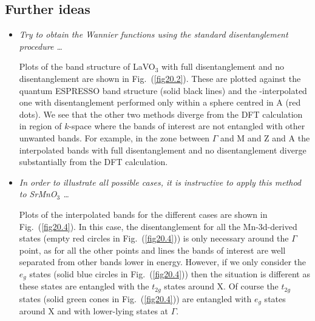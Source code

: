 \subsection*{Further ideas}
\begin{itemize}
	\item {\it Try to obtain the Wannier functions using the standard disentanglement procedure \dots}

	Plots of the band structure of LaVO$_3$ with full disentanglement and no disentanglement are shown in Fig.~(\ref{fig20.2}). These are plotted against the quantum ESPRESSO band structure (solid black lines) and the \Wannier{}-interpolated one with disentanglement performed only within a sphere centred in A (red dots). We see that the other two methods diverge from the DFT calculation in region of $k$-space where the bands of interest are not entangled with other unwanted bands. For example, in the zone between $\Gamma$ and M and Z and A the interpolated bands with full disentanglement and no disentanglement diverge substantially from the DFT calculation.  

	\item {\it In order to illustrate all possible cases, it is instructive to apply this method to SrMnO$_3$ \dots}

	Plots of the interpolated bands for the different cases are shown in Fig.~(\ref{fig20.4}). In this case, the disentanglement for all the Mn-3d-derived states (empty red circles in Fig.~(\ref{fig20.4})) is only necessary around the $\Gamma$ point, as for all the other points and lines the bands of interest are well separated from other bands lower in energy. However, if we only consider the $e_g$ states (solid blue circles in Fig.~(\ref{fig20.4})) then the situation is different as these states are entangled with the $t_{2g}$ states around X. Of course the $t_{2g}$ states (solid green cones in Fig.~(\ref{fig20.4})) are entangled with $e_{g}$ states around X and with lower-lying states at $\Gamma$.

\end{itemize}

